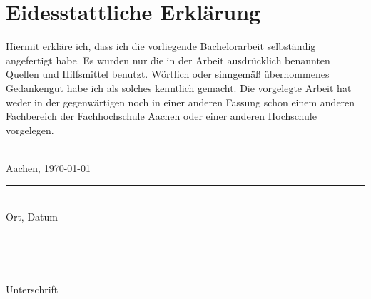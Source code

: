 \chapter*{Eidesstattliche Erklärung}
Hiermit erkläre ich, dass ich die vorliegende Bachelorarbeit selbständig angefertigt habe. Es wurden nur die in der Arbeit ausdrücklich benannten Quellen und Hilfsmittel benutzt. Wörtlich oder sinngemäß übernommenes Gedankengut habe ich als solches kenntlich gemacht. Die vorgelegte Arbeit hat weder in der gegenwärtigen noch in einer anderen Fassung schon einem anderen Fachbereich der Fachhochschule Aachen oder einer anderen Hochschule vorgelegen.\\[2.5cm]
\
\begin{minipage}{0.5\textwidth}
	\begin{flushleft}
		Aachen, \today \\[-4.5mm]
		\rule{0.75\textwidth}{0.5mm}
		\\
		Ort, Datum
	\end{flushleft}
\end{minipage}
\begin{minipage}{0.5\textwidth}
	\begin{flushright}
		\ \\[-2.3mm]
		\rule{0.75\textwidth}{0.5mm}
		\\
		Unterschrift
	\end{flushright}
\end{minipage}